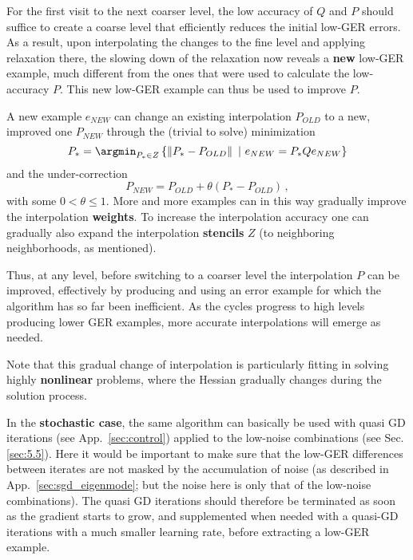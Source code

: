 \documentclass{article} %
\begin{document}
For the first visit to the next coarser level, the low accuracy of $Q$ and $P$ should suffice to create a coarse level that efficiently reduces the initial low-GER errors. As a result, upon interpolating the changes to the fine level and applying relaxation there, the slowing down of the relaxation now reveals a \textbf{new} low-GER example, much different from the ones that were used to calculate the low-accuracy $P$. This new low-GER example can thus be used to improve $P$.

A new example $e_{NEW}$ can change an existing interpolation $P_{OLD}$ to a new, improved one $P_{NEW}$ through the (trivial to solve) minimization
\begin{equation}
  P_* = \argmin_{P_* \in Z} \left\{ \left\| P_* - P_{OLD} \right\| \,\, | \,\, e_{NEW} = P_* Q e_{NEW} \right\}
\label{p_star}
\end{equation}
and the under-correction
$$
  P_{NEW} = P_{OLD} + \theta \left( P_* - P_{OLD} \right)\,,
$$
with some $0 < \theta \leq 1$. More and more examples can in this way gradually improve the interpolation \textbf{weights}. To increase the interpolation accuracy one can gradually also expand the interpolation \textbf{stencils} $Z$ (to neighboring neighborhoods, as mentioned).

Thus, at any level, before switching to a coarser level the interpolation $P$ can be improved, effectively by producing and using an error example for which the algorithm has so far been inefficient. As the cycles progress to high levels producing lower GER examples, more accurate interpolations will emerge as needed.

Note that this gradual change of interpolation is particularly fitting in solving highly \textbf{nonlinear} problems, where the Hessian gradually changes during the solution process.

In the \textbf{stochastic case}, the same algorithm can basically be used with quasi GD iterations (see App.~\ref{sec:control}) applied to the low-noise combinations (see Sec.\ref{sec:5.5}). Here it would be important to make sure that the low-GER differences between iterates are not masked by the accumulation of noise (as described in App.~\ref{sec:sgd_eigenmode}; but the noise here is only that of the low-noise combinations). The quasi GD iterations should therefore be terminated as soon as the gradient starts to grow, and supplemented when needed with a quasi-GD iterations with a much smaller learning rate, before extracting a low-GER example.
\end{document}
